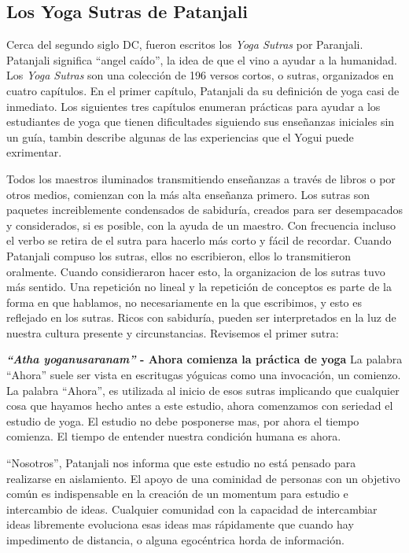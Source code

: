 \subsection{Los Yoga Sutras de Patanjali}
Cerca del segundo siglo DC, fueron escritos los \textit{Yoga Sutras} por Paranjali. Patanjali significa ``angel caído'', la idea de que el vino a ayudar a la humanidad. Los \textit{Yoga Sutras} son una colección de 196 versos cortos, o sutras, organizados en cuatro capítulos. En el primer capítulo, Patanjali da su definición de yoga casi de inmediato. Los siguientes tres capítulos enumeran prácticas para ayudar a los estudiantes de yoga que tienen dificultades siguiendo sus enseñanzas iniciales sin un guía, tambin describe algunas de las experiencias que el Yogui puede exrimentar.

Todos los maestros iluminados transmitiendo enseñanzas a trav\'es de libros o por otros medios, comienzan con la más alta enseñanza primero. Los sutras son paquetes increiblemente condensados de sabiduría, creados para ser desempacados y considerados, si es posible, con la ayuda de un maestro. Con frecuencia incluso el verbo se retira de el sutra para hacerlo más corto y fácil de recordar. Cuando Patanjali compuso los sutras, ellos no escribieron, ellos lo transmitieron oralmente. Cuando considieraron hacer esto, la organizacion de los sutras tuvo más sentido. Una repetición no lineal y la repetición de conceptos es parte de la forma en que hablamos, no necesariamente en la que escribimos, y esto es reflejado en los sutras. Ricos con sabiduría, pueden ser interpretados en la luz de nuestra cultura presente y circunstancias. Revisemos el primer sutra:

\textbf{\textit{``Atha yoganusaranam''} - Ahora comienza la práctica de yoga}
La palabra ``Ahora'' suele ser vista en escritugas yóguicas como una invocación, un comienzo. La palabra ``Ahora'', es utilizada al inicio de esos sutras implicando que cualquier cosa que hayamos hecho antes a este estudio, ahora comenzamos  con seriedad el estudio de yoga. El estudio no debe posponerse mas, por ahora el tiempo comienza. El tiempo de entender nuestra condición humana es ahora.

``Nosotros'', Patanjali nos informa que este estudio no está pensado para realizarse en aislamiento. El apoyo de una cominidad de personas con un objetivo común es indispensable en la creación de un momentum para estudio e intercambio de ideas. Cualquier comunidad con la capacidad de intercambiar ideas libremente evoluciona esas ideas mas rápidamente que cuando hay impedimento de distancia, o alguna egoc\'entrica horda de información.

